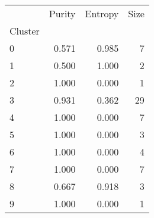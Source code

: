 \begin{tabular}{lrrr}
\toprule
{} &  Purity &  Entropy &  Size \\
Cluster &         &          &       \\
\midrule
0       &   0.571 &    0.985 &     7 \\
1       &   0.500 &    1.000 &     2 \\
2       &   1.000 &   0.000 &     1 \\
3       &   0.931 &    0.362 &    29 \\
4       &   1.000 &   0.000 &     7 \\
5       &   1.000 &   0.000 &     3 \\
6       &   1.000 &   0.000 &     4 \\
7       &   1.000 &   0.000 &     7 \\
8       &   0.667 &    0.918 &     3 \\
9       &   1.000 &   0.000 &     1 \\
\bottomrule
\end{tabular}
